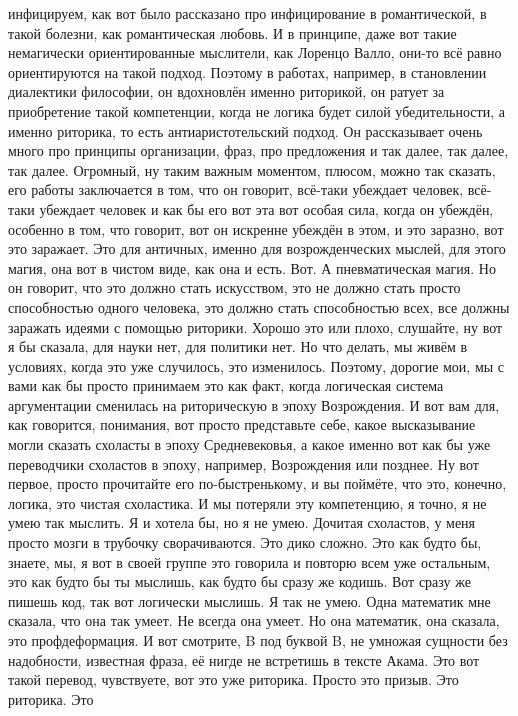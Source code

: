 инфицируем, как вот было рассказано про инфицирование в романтической, в такой
болезни, как романтическая любовь. И в принципе, даже вот такие немагически
ориентированные мыслители, как Лоренцо Валло, они-то всё равно ориентируются на
такой подход. Поэтому в работах, например, в становлении диалектики философии,
он вдохновлён именно риторикой, он ратует за приобретение такой компетенции,
когда не логика будет силой убедительности, а именно риторика, то есть
антиаристотельский подход. Он рассказывает очень много про принципы организации,
фраз, про предложения и так далее, так далее, так далее. Огромный, ну таким
важным моментом, плюсом, можно так сказать, его работы заключается в том, что он
говорит, всё-таки убеждает человек, всё-таки убеждает человек и как бы его вот
эта вот особая сила, когда он убеждён, особенно в том, что говорит, вот он
искренне убеждён в этом, и это заразно, вот это заражает. Это для античных,
именно для возрожденческих мыслей, для этого магия, она вот в чистом виде, как
она и есть. Вот. А пневматическая магия. Но он говорит, что это должно стать
искусством, это не должно стать просто способностью одного человека, это должно
стать способностью всех, все должны заражать идеями с помощью риторики. Хорошо
это или плохо, слушайте, ну вот я бы сказала, для науки нет, для политики нет.
Но что делать, мы живём в условиях, когда это уже случилось, это изменилось.
Поэтому, дорогие мои, мы с вами как бы просто принимаем это как факт, когда
логическая система аргументации сменилась на риторическую в эпоху Возрождения. И
вот вам для, как говорится, понимания, вот просто представьте себе, какое
высказывание могли сказать схоласты в эпоху Средневековья, а какое именно вот
как бы уже переводчики схоластов в эпоху, например, Возрождения или позднее. Ну
вот первое, просто прочитайте его по-быстренькому, и вы поймёте, что это,
конечно, логика, это чистая схоластика. И мы потеряли эту компетенцию, я точно,
я не умею так мыслить. Я и хотела бы, но я не умею. Дочитая схоластов, у меня
просто мозги в трубочку сворачиваются. Это дико сложно. Это как будто бы,
знаете, мы, я вот в своей группе это говорила и повторю всем уже остальным, это
как будто бы ты мыслишь, как будто бы сразу же кодишь. Вот сразу же пишешь код,
так вот логически мыслишь. Я так не умею. Одна математик мне сказала, что она
так умеет. Не всегда она умеет. Но она математик, она сказала, это
профдеформация. И вот смотрите, B под буквой B, не умножая сущности без
надобности, известная фраза, её нигде не встретишь в тексте Акама. Это вот такой
перевод, чувствуете, вот это уже риторика. Просто это призыв. Это риторика. Это
